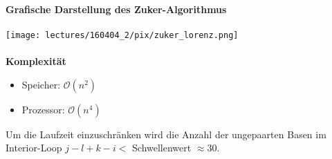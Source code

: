 \paragraph{}
 \textbf{Grafische Darstellung des Zuker-Algorithmus}\\\\
\texttt{[image: lectures/160404\_2/pix/zuker\_lorenz.png]}\\
\paragraph{}
 \textbf{Komplexit\"at}
\begin{itemize}
	\item[] Speicher: $\mathcal{O}(n^2)$
	\item[] Prozessor: $\mathcal{O}(n^4)$
\end{itemize}
Um die Laufzeit einzuschr\"anken wird die Anzahl der ungepaarten Basen im Interior-Loop $j-l+k-i<$ Schwellenwert $\approx 30$.